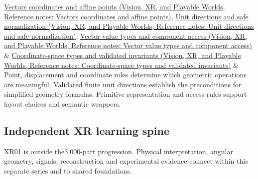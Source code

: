 {\begin{longtable}[]
\href{../07-Vision-XR-and-Playable-Worlds/main.pdf\#nameddest=appendix-0659864c0aa3}{Vectors coordinates and affine points (Vision, XR, and Playable Worlds, Reference notes: Vectors coordinates and affine points)}, \href{../07-Vision-XR-and-Playable-Worlds/main.pdf\#nameddest=appendix-f744e41b95b4}{Unit directions and safe normalization (Vision, XR, and Playable Worlds, Reference notes: Unit directions and safe normalization)}, \href{../07-Vision-XR-and-Playable-Worlds/main.pdf\#nameddest=appendix-37a39984ba66}{Vector value types and component access (Vision, XR, and Playable Worlds, Reference notes: Vector value types and component access)} & \href{../07-Vision-XR-and-Playable-Worlds/main.pdf\#nameddest=appendix-380a220e2529}{Coordinate-space types and validated invariants (Vision, XR, and Playable Worlds, Reference notes: Coordinate-space types and validated invariants)} & Point, displacement and coordinate roles determine which geometric operations are meaningful. Validated finite unit directions establish the preconditions for simplified geometry formulas. Primitive representation and access rules support layout choices and semantic wrappers. \\
\end{longtable}
}

\subsection{Independent XR learning spine}\label{appendix-4ad47bdd269a-independent-xr-learning-spine}

XR01 is outside the3,000-part progression. Physical interpretation, angular geometry, signals, reconstruction and experimental evidence connect within this separate series and to shared foundations.

